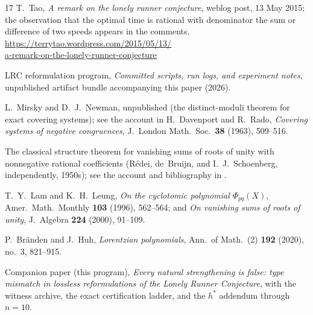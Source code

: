 \documentclass[11pt,a4paper]{article}
\numberwithin{equation}{section}
\theoremstyle{plain}
\theoremstyle{definition}
\theoremstyle{remark}
\begin{document}
\begin{thebibliography}{17}
T.~Tao,
\emph{A remark on the lonely runner conjecture},
weblog post, 13 May 2015; the observation that the optimal time is
rational with denominator the sum or difference of two speeds appears
in the comments.
\\[2pt]
\url{https://terrytao.wordpress.com/2015/05/13/}\\
\url{a-remark-on-the-lonely-runner-conjecture}

LRC reformulation program,
\emph{Committed scripts, run logs, and experiment notes},
unpublished artifact bundle accompanying this paper (2026).

L.~Mirsky and D.~J.~Newman,
unpublished (the distinct-moduli theorem for exact covering systems);
see the account in
H.~Davenport and R.~Rado,
\emph{Covering systems of negative congruences},
J.\ London Math.\ Soc.\ \textbf{38} (1963), 509--516.

The classical structure theorem for vanishing sums of roots of unity
with nonnegative rational coefficients (R\'edei, de~Bruijn, and
I.~J.~Schoenberg, independently, 1950s); see the account and
bibliography in \cite{LamLeung}.

T.~Y.~Lam and K.~H.~Leung,
\emph{On the cyclotomic polynomial $\Phi_{pq}(X)$},
Amer.\ Math.\ Monthly \textbf{103} (1996), 562--564; and
\emph{On vanishing sums of roots of unity},
J.\ Algebra \textbf{224} (2000), 91--109.

P.~Br\"anden and J.~Huh,
\emph{Lorentzian polynomials},
Ann.\ of Math.\ (2) \textbf{192} (2020), no.~3, 821--915.

Companion paper (this program),
\emph{Every natural strengthening is false: type mismatch in lossless
reformulations of the Lonely Runner Conjecture},
with the witness archive, the exact certification ladder, and the
$h^*$ addendum through $n=10$.

\end{thebibliography}
\endgroup
\end{document}

